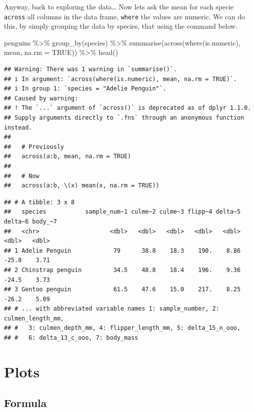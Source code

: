 \documentclass[
]{book}
\newenvironment{Shaded}{\begin{snugshade}}{\end{snugshade}}
\newcommand{\AttributeTok}[1]{\textcolor[rgb]{0.77,0.63,0.00}{#1}}
\newcommand{\ConstantTok}[1]{\textcolor[rgb]{0.00,0.00,0.00}{#1}}
\newcommand{\FunctionTok}[1]{\textcolor[rgb]{0.00,0.00,0.00}{#1}}
\newcommand{\NormalTok}[1]{#1}
\newcommand{\SpecialCharTok}[1]{\textcolor[rgb]{0.00,0.00,0.00}{#1}}
\begin{document}
Anyway, back to exploring the data\ldots{} Now lets ask the mean for each specie \texttt{across} all columns in the data frame, \texttt{where} the values are numeric.
We can do this, by simply grouping the data by species, that using the command below.

\begin{Shaded}
\begin{Highlighting}[]
\NormalTok{penguins }\SpecialCharTok{\%\textgreater{}\%} 
  \FunctionTok{group\_by}\NormalTok{(species) }\SpecialCharTok{\%\textgreater{}\%} 
  \FunctionTok{summarise}\NormalTok{(}\FunctionTok{across}\NormalTok{(}\FunctionTok{where}\NormalTok{(is.numeric), mean, }\AttributeTok{na.rm =} \ConstantTok{TRUE}\NormalTok{)) }\SpecialCharTok{\%\textgreater{}\%} 
  \FunctionTok{head}\NormalTok{()}
\end{Highlighting}
\end{Shaded}

\begin{verbatim}
## Warning: There was 1 warning in `summarise()`.
## i In argument: `across(where(is.numeric), mean, na.rm = TRUE)`.
## i In group 1: `species = "Adelie Penguin"`.
## Caused by warning:
## ! The `...` argument of `across()` is deprecated as of dplyr 1.1.0.
## Supply arguments directly to `.fns` through an anonymous function instead.
## 
##   # Previously
##   across(a:b, mean, na.rm = TRUE)
## 
##   # Now
##   across(a:b, \(x) mean(x, na.rm = TRUE))
\end{verbatim}

\begin{verbatim}
## # A tibble: 3 x 8
##   species           sample_num~1 culme~2 culme~3 flipp~4 delta~5 delta~6 body_~7
##   <chr>                    <dbl>   <dbl>   <dbl>   <dbl>   <dbl>   <dbl>   <dbl>
## 1 Adelie Penguin            79      38.8    18.3    190.    8.86   -25.8    3.71
## 2 Chinstrap penguin         34.5    48.8    18.4    196.    9.36   -24.5    3.73
## 3 Gentoo penguin            61.5    47.6    15.0    217.    8.25   -26.2    5.09
## # ... with abbreviated variable names 1: sample_number, 2: culmen_length_mm,
## #   3: culmen_depth_mm, 4: flipper_length_mm, 5: delta_15_n_ooo,
## #   6: delta_13_c_ooo, 7: body_mass
\end{verbatim}

\hypertarget{plots}{%
\section{Plots}\label{plots}}

\hypertarget{formula}{%
\subsection{Formula}\label{formula}}
\end{document}
